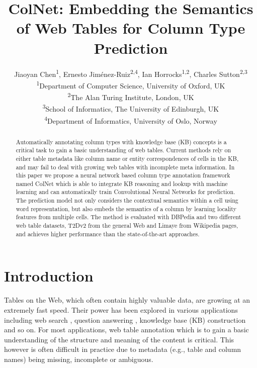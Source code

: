\documentclass[letterpaper]{article}
\newcommand{\ernesto}[1]{{\color{black}#1}}
\newcommand{\rv}[1]{{\color{black}#1}}
\newcommand{\camera}[1]{{\color{black}#1}}
\newcommand{\ColNet}{\textsf{ColNet}\xspace}
\newcommand*{\affaddr}[1]{#1} \newcommand*{\affmark}[1][*]{\textsuperscript{#1}}
\begin{document}
\title{\ColNet: Embedding the Semantics of Web Tables for Column Type Prediction}

\author{
Jiaoyan Chen\affmark[1], Ernesto Jim\'enez-Ruiz\affmark[2,4], Ian Horrocks\affmark[1,2], Charles Sutton\affmark[2,3]
\\
\affaddr{\affmark[1]Department of Computer Science, University of Oxford, UK}\\
\affaddr{\affmark[2]The Alan Turing Institute, London, UK} \\
\affaddr{\affmark[3]School of Informatics, The University of Edinburgh,  UK} \\
\affaddr{\affmark[4]Department of Informatics, University of Oslo, Norway} \\
}
\maketitle

\begin{abstract}
Automatically annotating column types with knowledge base (KB) concepts is a critical task to gain a basic understanding of web tables.
Current methods rely on either table metadata like column name
or entity correspondences of cells in the KB,
and may fail to deal with growing web tables with incomplete meta information.
In this paper we propose a neural network based column type annotation framework named \ColNet 
which is able to integrate KB reasoning and lookup with machine learning 
and can automatically train Convolutional Neural Networks for prediction.
The prediction model not only considers the \rv{contextual semantics within a cell using word representation},
but also embeds the \camera{semantics} of a column by learning locality features from multiple cells.
The method is evaluated with DBPedia and two different web table datasets, 
T2Dv2 from the general Web and Limaye from Wikipedia pages,
and achieves higher performance than the \rv{state-of-the-art approaches}.
\end{abstract}

\section{Introduction}
Tables on the Web, which often contain \ernesto{highly valuable}  data, are growing at an extremely fast speed.
Their power has been explored in various applications including web search \cite{cafarella2008webtables}, question answering \cite{sun2016table}, knowledge base (KB) construction \cite{ritze2016profiling} and so on.
For most applications, 
web table annotation which is to gain a basic understanding of the structure and meaning of the content is critical.
This however is often difficult in practice due to metadata (e.g., table and column names) being missing, incomplete or ambiguous.
\end{document}
